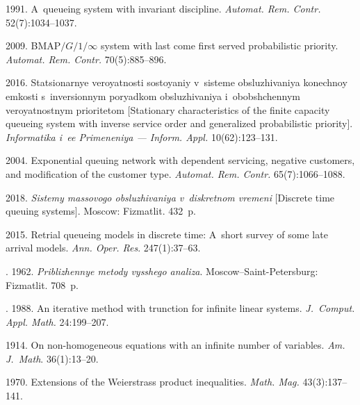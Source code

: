 \begin{multicols}{2}
{{\begin{thebibliography}{99}
 1991.
A~queueing system with invariant discipline.
\textit{Automat. Rem. Contr.} 52(7):1034--1037.

 2009. BMAP${/G/1/\infty}$ system with last
come first served probabilistic priority. \textit{Automat. Rem.
Contr.} 70(5):885--896.

 2016. Statsionarnye veroyatno\-sti sostoyaniy 
v~sisteme obsluzhivaniya konechnoy emkosti s~inversionnym poryadkom 
obsluzhivaniya i~obobshchennym veroyatnostnym prioritetom
[Stationary characteristics of the finite capacity queueing system with 
inverse service order and generalized probabilistic priority]. 
\textit{Informatika i~ee Primeneniya --- Inform. Appl.} 10(62):123--131.

 2004. 
Exponential queuing network with dependent servicing, negative customers, 
and modification of the customer type.
\textit{Automat. Rem. Contr.} 65(7):1066--1088.

 2018.
\textit{Sistemy massovogo obsluzhivaniya v~diskretnom vremeni}
[Discrete time queuing systems]. Moscow: Fizmatlit. 432~p.

 2015.
Retrial queueing models in discrete time: A~short survey of some late 
arrival models.
\textit{Ann. Oper. Res}. 247(1):37--63.

. 1962.
\textit{Priblizhennye metody vysshego analiza}.
Moscow--Saint-Petersburg: Fizmatlit. 708~p. 

. 1988.
An iterative method with trunction for infinite linear systems. 
\textit{J.~Comput. Appl. Math.}
24:199--207.

 1914.
On non-homogeneous equations with an infinite number of variables.
\textit{Am. J.~Math}. 36(1):13--20.

 1970. 
Extensions of the Weierstrass product inequalities.
\textit{Math. Mag.} 43(3):137--141.
\end{thebibliography}

 }
 }

\end{multicols}

